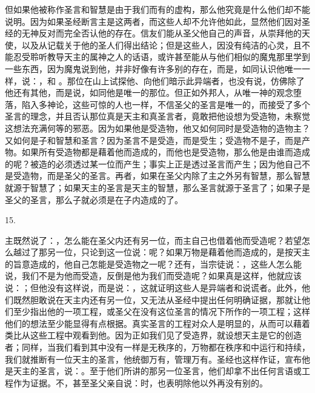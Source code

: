 但如果他被称作圣言和智慧是由于我们而有的虚构，那么他究竟是什么他们却不能说明。因为如果圣经断言主是这两者，而这些人却不允许他如此，显然他们因对圣经的无神反对而完全否认他的存在。信友们能从圣父他自己的声音，从崇拜他的天使，以及从记载关于他的圣人们得出结论；但是这些人，因没有纯洁的心灵，且不能忍受聆听教导天主的属神之人的话语，或许甚至能从与他们相似的魔鬼那里学到一些东西，因为魔鬼说到他，并非好像有许多别的存在，而是，如同认识他唯一一样，说：，和 。那位在山上试探他、向他们暗示此异端者，也没有说，仿佛除了他还有其他，而是说，如同他是唯一的那位。但正如外邦人，从唯一神的观念堕落，陷入多神论，这些可惊的人也一样，不信圣父的圣言是唯一的，而接受了多个圣言的理念，并且否认那位真是天主和真圣言者，竟敢把他设想为受造物，未察觉这想法充满何等的邪恶。因为如果他是受造物，他又如何同时是受造物的造物主？又如何是子和智慧和圣言？因为圣言不是受造，而是受生；受造物不是子，而是产物。如果所有受造物都是藉着他而造成的，而他也是受造物，那么他是由谁而造成的呢？被造的必须透过某一位而产生；事实上正是透过圣言而产生；因为他自己不是受造物，而是圣父的圣言。再者，如果在圣父内除了主之外另有智慧，那么智慧就源于智慧了；如果天主的圣言是天主的智慧，那么圣言就源于圣言了；如果子是圣父的圣言，那么子就必须是在子内造成的了。\par

15. \par

主既然说了：，怎么能在圣父内还有另一位，而主自己也借着他而受造呢？若望怎么越过了那另一位，只论到这一位说：呢？如果万物是藉着他而造成的，是按天主的旨意造成的，他自己怎能是受造物之一呢？还有，当宗徒说：，这些人怎么能说，我们不是为他而受造，反倒是他为我们而受造呢？如果真是这样，他就应该说：；但他没有这样说，而是说：，这就证明这些人是异端者和说谎者。此外，他们既然胆敢说在天主内还有另一位，又无法从圣经中提出任何明确证据，那就让他们至少指出他的一项工程，或圣父在没有这位圣言的情况下所作的一项工程；这样他们的想法至少能显得有点根据。真实圣言的工程对众人是明显的，从而可以藉着类比从这些工程中观看到他。因为正如我们见了受造界，就设想天主是它的创造者；同样，当我们看到其中没有一样是无秩序的，万物都在秩序和中运行和持续，我们就推断有一位天主的圣言，他统御万有，管理万有。圣经也这样作证，宣布他是天主的圣言，说：。至于他们所讲的那另一位圣言，他们却拿不出任何言语或工程作为证据。不，甚至圣父亲自说：时，也表明除他以外再没有别的。\par

